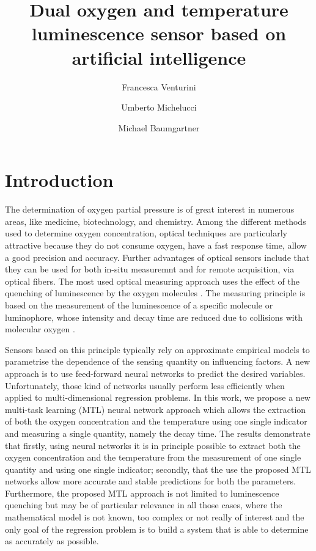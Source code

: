 \documentclass[9pt,twocolumn,twoside,pdftex]{optica}
\title{Dual oxygen and temperature luminescence sensor based on artificial intelligence}
\author[1,2,*]{Francesca Venturini}
\author[2]{Umberto Michelucci}
\author[1]{Michael Baumgartner}
\affil[1]{Institute of Applied Mathematics and Physics, Zurich University of Applied Sciences,
Technikumstrasse 9, 8401 Winterthur, Switzerland}
\affil[2]{TOELT LLC; Birchlenstr. 25, 8600 Dübendorf, Switzerland}
\affil[*]{Corresponding author: francesca.venturini@zhaw.ch}
\begin{document}
\maketitle

\section{Introduction}

The determination of oxygen partial pressure is of great interest in numerous areas, like medicine, biotechnology, and chemistry. Among the different methods used to determine oxygen concentration, optical techniques are particularly attractive because they do not consume oxygen, have a fast response time, allow a good precision and accuracy. Further advantages of optical sensors include that they can be used for both in-situ measuremnt and for remote acquisition, via optical fibers. 
The most used optical measuring approach uses the effect of the quenching of luminescence by the oxygen molecules \cite{Wang2014}. The measuring principle is based on the measurement of the luminescence of a specific molecule or luminophore, whose intensity and decay time are reduced due to collisions with molecular oxygen \cite{Lakowicz2006}.

Sensors based on this principle typically rely on approximate empirical models to parametrise the dependence of the sensing quantity on influencing factors. A new approach is to use feed-forward neural networks to predict the desired variables. Unfortunately, those kind of networks usually perform less efficiently when applied to multi-dimensional regression problems. In this work, we propose a new multi-task learning (MTL) neural network approach which allows the extraction of both the oxygen concentration and the temperature using one single indicator and measuring a single quantity, namely the decay time. The results demonstrate that firstly, using neural networks it is in principle possible to extract both the oxygen concentration and the temperature from the measurement of one single quantity and using one single indicator; secondly, that the use the proposed MTL networks allow more accurate and stable predictions for both the parameters. Furthermore, the proposed MTL approach is not limited to luminescence quenching but may be of particular relevance in all those cases, where the mathematical model is not known, too complex or not really of interest and the only goal of the regression problem is to build a system that is able to determine as accurately as possible.
\end{document}
